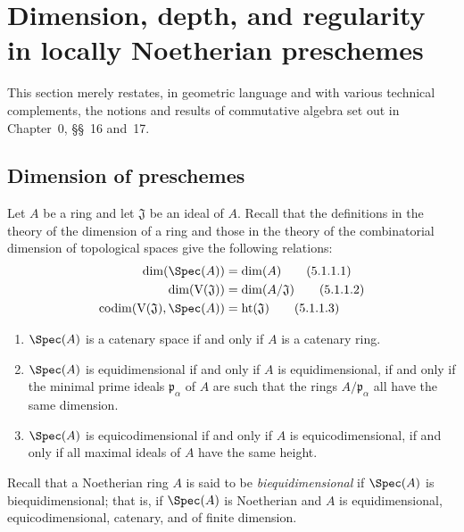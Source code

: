 \section{Dimension, depth, and regularity in locally Noetherian preschemes}
\label{section:IV.5}


This section merely restates, in geometric language and with various
technical complements, the notions and results of commutative algebra
set out in Chapter~0, \S\S~16 and~17.

\subsection{Dimension of preschemes}
\label{subsection:IV.5.1}

\begin{env}[5.1.1]
\label{IV.5.1.1}
Let $A$ be a ring and let $\mathfrak J$ be an ideal of $A$.
Recall  that the definitions in the theory of the
dimension of a ring  and those in the theory of the
combinatorial dimension of topological spaces  give
the following relations:
\begin{align}
\dim(\Spec(A))&=\dim(A)
\tag{5.1.1.1}\label{IV.5.1.1.1}\\
\dim(\mathrm V(\mathfrak J))&=\dim(A/\mathfrak J)
\tag{5.1.1.2}\label{IV.5.1.1.2}\\
\operatorname{codim}(\mathrm V(\mathfrak J),\Spec(A))
  &=\operatorname{ht}(\mathfrak J)
\tag{5.1.1.3}\label{IV.5.1.1.3}
\end{align}

\begin{enumerate}
\item[\textbf{(5.1.1.4)}]
{}
$\Spec(A)$ is a catenary space if and only if $A$ is a catenary ring.
\item[\textbf{(5.1.1.5)}]
{}
$\Spec(A)$ is equidimensional if and only if $A$ is equidimensional,
if and only if the minimal prime ideals $\mathfrak p_\alpha$ of $A$
are such that the rings $A/\mathfrak p_\alpha$ all have the same
dimension.
\item[\textbf{(5.1.1.6)}]
{}
$\Spec(A)$ is equicodimensional if and only if $A$ is
equicodimensional, if and only if all maximal ideals of $A$ have the
same height.
\end{enumerate}

Recall that a Noetherian ring $A$ is said to be
\emph{biequidimensional} if $\Spec(A)$ is biequidimensional; that is,
if $\Spec(A)$ is Noetherian and $A$ is equidimensional,
equicodimensional, catenary, and of finite dimension.
\end{env}

